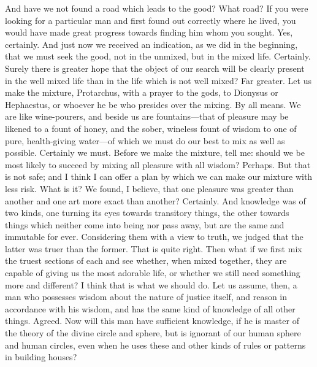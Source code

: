 \documentclass[letterpaper,12pt]{article}
\newcommand{\stephpag}[1]{\marginnote{\small\itshape\fontfamily{ppl}\selectfont #1}}
\begin{document}
\begin{drama}
And have we not found a road which leads to the good?
\protarchusspeaks
What road?
\socratesspeaks
If you were looking for a particular man and \stephpag{b} first found out correctly where he lived, you would have made great progress towards finding him whom you sought.
\protarchusspeaks
Yes, certainly.
\socratesspeaks
And just now we received an indication, as we did in the beginning, that we must seek the good, not in the unmixed, but in the mixed life.
\protarchusspeaks
Certainly.
\socratesspeaks
Surely there is greater hope that the object of our search will be clearly present in the well mixed life than in the life which is not well mixed?
\protarchusspeaks
Far greater.
\socratesspeaks
Let us make the mixture, Protarchus, with a prayer to the gods, \stephpag{c} to Dionysus or Hephaestus, or whoever he be who presides over the mixing.
\protarchusspeaks
By all means.
\socratesspeaks
We are like wine-pourers, and beside us are fountains---that of pleasure may be likened to a fount of honey, and the sober, wineless fount of wisdom to one of pure, health-giving water---of which we must do our best to mix as well as possible.
\protarchusspeaks
Certainly we must. \stephpag{d}
\socratesspeaks
Before we make the mixture, tell me: should we be most likely to succeed by mixing all pleasure with all wisdom?
\protarchusspeaks
Perhaps.
\socratesspeaks
But that is not safe; and I think I can offer a plan by which we can make our mixture with less risk.
\protarchusspeaks
What is it?
\socratesspeaks
We found, I believe, that one pleasure was greater than another and one art more exact than another?
\protarchusspeaks
Certainly.
\socratesspeaks
And knowledge was of two kinds, one turning its eyes towards transitory things, \stephpag{e} the other towards things which neither come into being nor pass away, but are the same and immutable for ever. Considering them with a view to truth, we judged that the latter was truer than the former.
\protarchusspeaks
That is quite right.
\socratesspeaks
Then what if we first mix the truest sections of each and see whether, when mixed together, they are capable of giving us the most adorable life, or whether we still need something more and different? \stephpag{62 a}
\protarchusspeaks
I think that is what we should do.
\socratesspeaks
Let us assume, then, a man who possesses wisdom about the nature of justice itself, and reason in accordance with his wisdom, and has the same kind of knowledge of all other things.
\protarchusspeaks
Agreed.
\socratesspeaks
Now will this man have sufficient knowledge, if he is master of the theory of the divine circle and sphere, but is ignorant of our human sphere and human circles, even when he uses these \stephpag{b} and other kinds of rules or patterns in building houses?

\end{drama}
\end{document}

